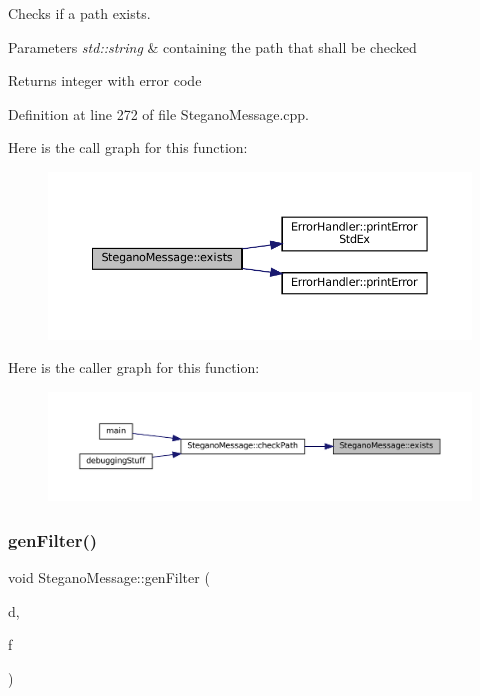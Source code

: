 Checks if a path exists. 


\begin{DoxyParams}{Parameters}
{\em std\+::string} & containing the path that shall be checked \\
\hline
\end{DoxyParams}
\begin{DoxyReturn}{Returns}
integer with error code 
\end{DoxyReturn}


Definition at line 272 of file Stegano\+Message.\+cpp.

Here is the call graph for this function\+:\nopagebreak
\begin{figure}[H]
\begin{center}
\leavevmode
\includegraphics[width=350pt]{classSteganoMessage_acc5a49a35b46d8bf4c40cca8b8c5a52b_cgraph}
\end{center}
\end{figure}
Here is the caller graph for this function\+:\nopagebreak
\begin{figure}[H]
\begin{center}
\leavevmode
\includegraphics[width=350pt]{classSteganoMessage_acc5a49a35b46d8bf4c40cca8b8c5a52b_icgraph}
\end{center}
\end{figure}
\mbox{\label{classSteganoMessage_a1cb326688e9a054127396d198bd6f976}} 
\subsubsection{\texorpdfstring{genFilter()}{genFilter()}}
{\footnotesize\ttfamily void Stegano\+Message\+::gen\+Filter (\begin{DoxyParamCaption}\item[{std\+::vector$<$ std\+::vector$<$ uint32\+\_\+t $>$$>$ $\ast$}]{d,  }\item[{uint32\+\_\+t($\ast$)(uint32\+\_\+t, size\+\_\+t)}]{f }\end{DoxyParamCaption})\hspace{0.3cm}{\ttfamily [private]}}



